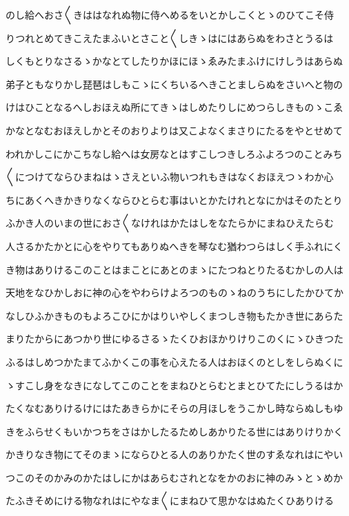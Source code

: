 \documentclass[a4paper,11pt,landscape]{ltjtarticle}
\begin{document}
のし給へおさ〱きははなれぬ物に侍へめるをいとかしこくとゝのひてこそ侍
\par\medskip
りつれとめてきこえたまふいとさこと〱しきゝはにはあらぬをわさとうるは
\par\medskip
しくもとりなさるゝかなとてしたりかほにほゝゑみたまふけにけしうはあらぬ
\par\medskip
弟子ともなりかし琵琶はしもこゝにくちいるへきことましらぬをさいへと物の
\par\medskip
けはひことなるへしおほえぬ所にてきゝはしめたりしにめつらしきものゝこゑ
\par\medskip
かなとなむおほえしかとそのおりよりは又こよなくまさりにたるをやとせめて
\par\medskip
われかしこにかこちなし給へは女房なとはすこしつきしろふよろつのことみち
\par\medskip
〱につけてならひまねはゝさえといふ物いつれもきはなくおほえつゝわか心
\par\medskip
ちにあくへきかきりなくならひとらむ事はいとかたけれとなにかはそのたとり
\par\medskip
ふかき人のいまの世におさ〱なけれはかたはしをなたらかにまねひえたらむ
\par\medskip
人さるかたかとに心をやりてもありぬへきを琴なむ猶わつらはしく手ふれにく
\par\medskip
き物はありけるこのことはまことにあとのまゝにたつねとりたるむかしの人は
\par\medskip
天地をなひかしおに神の心をやわらけよろつのものゝねのうちにしたかひてか
\par\medskip
なしひふかきものもよろこひにかはりいやしくまつしき物もたかき世にあらた
\par\medskip
まりたからにあつかり世にゆるさるゝたくひおほかりけりこのくにゝひきつた
\par\medskip
ふるはしめつかたまてふかくこの事を心えたる人はおほくのとしをしらぬくに
\par\medskip
ゝすこし身をなきになしてこのことをまねひとらむとまとひてたにしうるはか
\par\medskip
たくなむありけるけにはたあきらかにそらの月ほしをうこかし時ならぬしもゆ
\par\medskip
きをふらせくもいかつちをさはかしたるためしあかりたる世にはありけりかく
\par\medskip
かきりなき物にてそのまゝにならひとる人のありかたく世のすゑなれはにやい
\par\medskip
つこのそのかみのかたはしにかはあらむされとなをかのおに神のみゝとゝめか
\par\medskip
たふきそめにける物なれはにやなま〱にまねひて思かなはぬたくひありける
\end{document}

